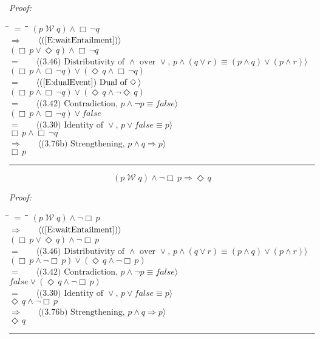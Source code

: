 \documentclass[fleqn, leqno]{article}
\newcommand{\lgap}{2pt}                             %
\newcommand{\mymathindent}{24pt}                    %
\newcommand{\impl}{\ensuremath{\Rightarrow}}        %
\newcommand{\Wait}{\;\mathcal{W}\;}
\newcommand{\Event}{\Diamond\,}
\newcommand{\Always}{\Box\,}
\newcommand{\myqed}{\rule[-.23ex]{1.2ex}{2.0ex}}
\newcommand{\myqedtab}{\hspace{388.5pt}}              %
\newcommand{\Gll} {\langle}                         %
\newcommand{\Ggg} {\rangle}                         %
\newcommand{\Hint}[1]     {\ \ \ $\Gll              \mbox{#1} \Ggg$ }   %
\begin{document}
\emph{Proof:}
\begin{tabbing}
\hspace{\mymathindent} \= $= \;$ \= \myqedtab \= \kill
\> \> $(p \Wait q) \land \Always\neg q$\\[\lgap]
\> $\impl$ \> \Hint{(\ref{E:waitEntailment})} \\[\lgap]
\> \> $(\Always p \lor \Event q) \land \Always\neg q$\\[\lgap]
\> $=$ \> \Hint{(3.46) Distributivity of $\land$ over $\lor$, $p\land (q\lor r)\equiv (p\land q)\lor (p\land r)$} \\[\lgap]
\> \> $(\Always p \land \Always\neg q) \lor (\Event q \land \Always\neg q)$\\[\lgap]
\> $=$ \> \Hint{(\ref{E:dualEvent}) Dual of $\Event$} \\[\lgap]
\> \> $(\Always p \land \Always\neg q) \lor (\Event q \land \neg\Event q)$\\[\lgap]
\> $=$ \> \Hint{(3.42) Contradiction, $p \land \neg p \equiv false$} \\[\lgap]
\> \> $(\Always p \land \Always\neg q) \lor false$\\[\lgap]
\> $=$ \> \Hint{(3.30) Identity of $\lor$, $p\lor false\equiv p$} \\[\lgap]
\> \> $\Always p \land \Always\neg q$\\[\lgap]
\> $\impl$ \> \Hint{(3.76b) Strengthening, $p\land q \impl p$} \\[\lgap]
\> \> $\Always p$ \> \myqed
\end{tabbing}

\begin{equation}\label{E:waitEntailEvent}
(p \Wait q) \land \neg\Always p \impl \Event q
\end{equation}

\emph{Proof:}
\begin{tabbing}
\hspace{\mymathindent} \= $= \;$ \= \myqedtab \= \kill
\> \> $(p \Wait q) \land \neg\Always p$\\[\lgap]
\> $\impl$ \> \Hint{(\ref{E:waitEntailment})} \\[\lgap]
\> \> $(\Always p \lor \Event q) \land \neg\Always p$\\[\lgap]
\> $=$ \> \Hint{(3.46) Distributivity of $\land$ over $\lor$, $p\land (q\lor r)\equiv (p\land q)\lor (p\land r)$} \\[\lgap]
\> \> $(\Always p \land \neg\Always p) \lor (\Event q \land \neg\Always p)$\\[\lgap]
\> $=$ \> \Hint{(3.42) Contradiction, $p \land \neg p \equiv false$} \\[\lgap]
\> \> $false \lor (\Event q \land \neg\Always p)$\\[\lgap]
\> $=$ \> \Hint{(3.30) Identity of $\lor$, $p\lor false\equiv p$} \\[\lgap]
\> \> $\Event q \land \neg\Always p$\\[\lgap]
\> $\impl$ \> \Hint{(3.76b) Strengthening, $p\land q \impl p$} \\[\lgap]
\> \> $\Event q$ \> \myqed
\end{tabbing}
\end{document}
